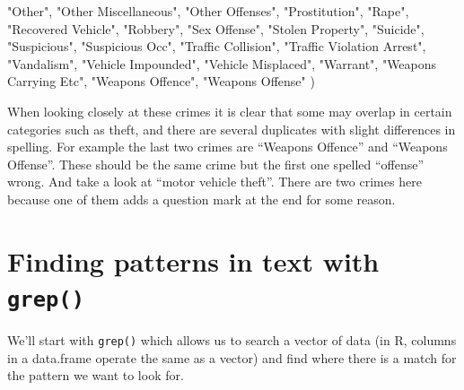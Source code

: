 \documentclass[
  12pt,
]{book}
\newenvironment{Shaded}{\begin{snugshade}}{\end{snugshade}}
\newcommand{\NormalTok}[1]{#1}
\newcommand{\StringTok}[1]{\textcolor[rgb]{0.5,0.5,0.5}{#1}}
\begin{document}
\begin{Shaded}
\begin{Highlighting}[]
  \StringTok{"Other"}\NormalTok{,                                    }
  \StringTok{"Other Miscellaneous"}\NormalTok{,                      }
  \StringTok{"Other Offenses"}\NormalTok{,                           }
  \StringTok{"Prostitution"}\NormalTok{,                             }
  \StringTok{"Rape"}\NormalTok{,                                     }
  \StringTok{"Recovered Vehicle"}\NormalTok{,                        }
  \StringTok{"Robbery"}\NormalTok{,                                  }
  \StringTok{"Sex Offense"}\NormalTok{,                              }
  \StringTok{"Stolen Property"}\NormalTok{,                          }
  \StringTok{"Suicide"}\NormalTok{,                                  }
  \StringTok{"Suspicious"}\NormalTok{,                               }
  \StringTok{"Suspicious Occ"}\NormalTok{,                           }
  \StringTok{"Traffic Collision"}\NormalTok{,                        }
  \StringTok{"Traffic Violation Arrest"}\NormalTok{,                 }
  \StringTok{"Vandalism"}\NormalTok{,                                }
  \StringTok{"Vehicle Impounded"}\NormalTok{,                        }
  \StringTok{"Vehicle Misplaced"}\NormalTok{,                        }
  \StringTok{"Warrant"}\NormalTok{,                                  }
  \StringTok{"Weapons Carrying Etc"}\NormalTok{,                     }
  \StringTok{"Weapons Offence"}\NormalTok{,                          }
  \StringTok{"Weapons Offense"}
\NormalTok{)}
\end{Highlighting}
\end{Shaded}

When looking closely at these crimes it is clear that some may overlap in certain categories such as theft, and there are several duplicates with slight differences in spelling. For example the last two crimes are ``Weapons Offence'' and ``Weapons Offense''. These should be the same crime but the first one spelled ``offense'' wrong. And take a look at ``motor vehicle theft''. There are two crimes here because one of them adds a question mark at the end for some reason.

\hypertarget{finding-patterns-in-text-with-grep}{%
\section{\texorpdfstring{Finding patterns in text with \texttt{grep()}}{Finding patterns in text with grep()}}\label{finding-patterns-in-text-with-grep}}

We'll start with \texttt{grep()} which allows us to search a vector of data (in R, columns in a data.frame operate the same as a vector) and find where there is a match for the pattern we want to look for.
\end{document}
